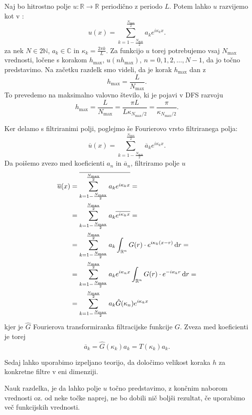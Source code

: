 \documentclass[mat2, tisk]{fmfdelo}
\newcommand{\R}{\mathbb R}
\newcommand{\N}{\mathbb N}
\newcommand{\C}{\mathbb C}
\begin{document}
\noindent
Naj bo hitrostno polje $u: \R \rightarrow \R$ periodično z periodo $L$.
Potem lahko $u$ razvijemo kot v :
$$
u(x) = \sum_{k=1-\frac{N_{\text{max}}}{2}}^{\frac{N_\text{max}}{2}} a_k e^{i\kappa_k x}.
$$
za nek $N \in 2\N$, $a_k \in \C$ in $\kappa_k = \frac{2\pi k}{L}$. 
Za funkcijo $u$ torej potrebujemo vsaj $N_{\text{max}}$ vrednosti, ločene s korakom $h_{\text{max}}$,
$u(n h_{\text{max}})$, $n = 0, 1, 2, \dots, N - 1$, da jo točno predstavimo.
Na začetku razdelk smo videli, da je korak $h_\text{max}$ dan z 
$$
h_\text{max} = \frac{L}{N_\text{max}}.
$$
To prevedemo na maksimalno valovno število, ki je pojavi v DFS razvoju 
$$
h_\text{max} = \frac{L}{N_\text{max}} = \frac{\pi L}{L \kappa_{{N_\text{max}/2}}} = \frac{\pi}{\kappa_{N_\text{max}/2}}.
$$

Ker delamo s filtriranimi polji, poglejmo še Fourierovo vrsto filtriranega polja:
\begin{equation}
\label{eq:filterDFT}
\overline{u}(x) = \sum_{k=1-\frac{N_{\text{max}}}{2}}^{\frac{N_\text{max}}{2}} \overline{a}_k e^{i\kappa_k x}.
\end{equation}
Da poišemo zvezo med koeficienti $a_n$ in $\overline{a}_n$, filtriramo polje $u$
\begin{align*}
\overline{u}(x) &= \overline{\sum_{k=1-\frac{N_{\text{max}}}{2}}^{\frac{N_\text{max}}{2}} a_k e^{i\kappa_k x}} = \\
&= \sum_{k=1-\frac{N_{\text{max}}}{2}}^{\frac{N_\text{max}}{2}} a_k \overline{e^{i\kappa_k x}} = \\ 
&= \sum_{k=1-\frac{N_{\text{max}}}{2}}^{\frac{N_\text{max}}{2}} a_k \int_{\R^n} G(r)\cdot e^{i\kappa_k(x - r)} \dif r = \\
&= \sum_{k=1-\frac{N_{\text{max}}}{2}}^{\frac{N_\text{max}}{2}} a_k e^{i\kappa_n x }\int_{\R^n} G(r)\cdot e^{-i\kappa_k r} \dif r =\\
&= \sum_{k=1-\frac{N_{\text{max}}}{2}}^{\frac{N_\text{max}}{2}} a_k \hat{G}(\kappa_n) e^{i\kappa_k x}
\end{align*}
kjer je $\hat{G}$ Fourierova transformiranka filtracijske funkcije $G$. Zveza med koeficienti je torej 
\begin{equation}
  \label{koef_filter}
\overline{a}_k = \hat{G}(\kappa_k) a_k = T(\kappa_k) a_k.
\end{equation}

Sedaj lahko uporabimo izpeljano teorijo, da določimo velikost koraka $h$ 
za konkretne filtre v eni dimenziji. 

\begin{opomba}
Nauk razdelka, je da lahko polje $u$ točno predstavimo, z končnim naborom 
vrednosti oz. od neke točke naprej, ne bo dobili nič boljši rezultat, če 
uporabimo več funkcijskih vrednosti.
\end{opomba}
\end{document}
